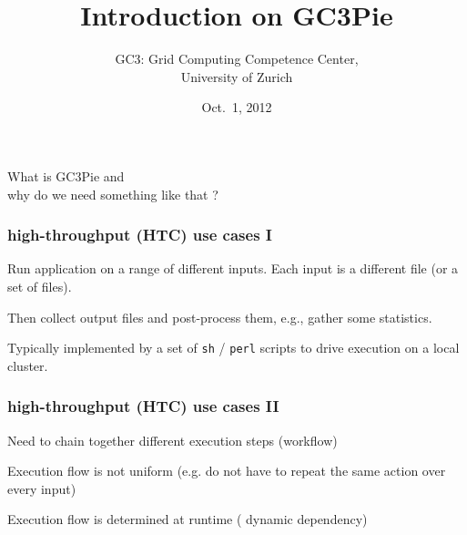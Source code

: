 \documentclass[english,serif,mathserif,xcolor=pdftex,dvipsnames,table]{beamer}
\title[Introduction on GC3Pie]{%
  Introduction on GC3Pie
}
\author[Sergio Maffioletti]{%
  GC3: Grid Computing Competence Center, \\
  University of Zurich
}
\date{Oct.~1, 2012}
\begin{document}
\maketitle



\begin{frame}
  \begin{center}
    \huge{What is {\color{Blue} GC3Pie} and \\ why do we need something like that ?}
  \end{center}
\end{frame}

\begin{frame}
  \frametitle{high-throughput (HTC) use cases I}
  
  \begin{block}{}
    Run application on a {\color{Blue} range} of different inputs.
    Each input is a different file (or a set of files).
  \end{block}
    
  \begin{block}{}
    Then {\color{Blue} collect} output files and post-process them, e.g., gather some
    statistics.
  \end{block}

  \begin{block}{}
    Typically implemented by a set of \texttt{sh} / \texttt{perl} scripts to drive
    execution on a local cluster.
  \end{block}
\end{frame}

\begin{frame}
  \frametitle{high-throughput (HTC) use cases II}

  \begin{block}{}
    Need to {\color{Blue} chain together} different execution steps
    (workflow)
  \end{block}

  \begin{block}{}
    Execution flow is not {\color{Blue} uniform} (e.g. do not have to
    repeat the same action over every input)
  \end{block}

  \begin{block}{}
    Execution flow is determined at runtime ({\color{Blue} dynamic
    dependency})
  \end{block}

\end{frame}
\end{document}
